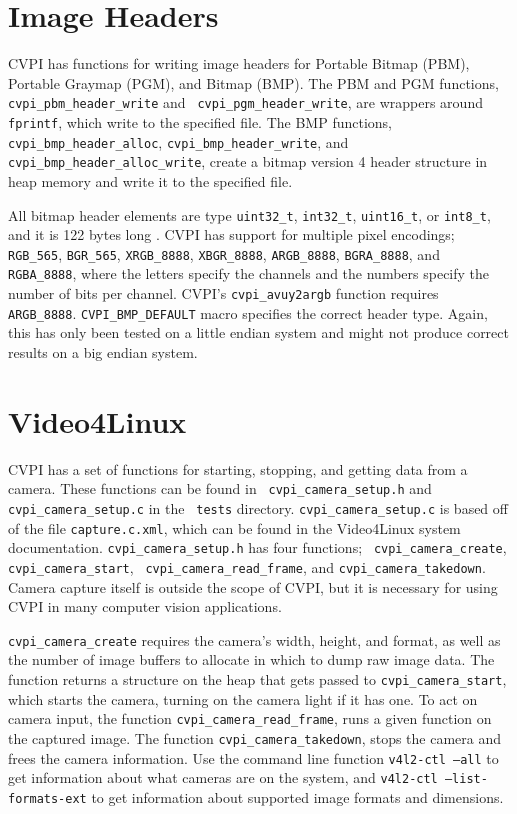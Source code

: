 \documentclass[12pt]{report}
\begin{document}
\chapter{Image Headers}
\label{sec-7}
CVPI has functions for writing image headers for Portable Bitmap
(PBM), Portable Graymap (PGM), and Bitmap (BMP). The PBM and PGM
functions, {\tt cvpi\_pbm\_header\_write} and {\tt
  cvpi\_pgm\_header\_write}, are wrappers around {\tt fprintf}, which
write to the specified file. The BMP functions, {\tt
  cvpi\_bmp\_header\_alloc}, {\tt cvpi\_bmp\_header\_write}, and {\tt
  cvpi\_bmp\_header\_alloc\_write}, create a bitmap version 4 header structure
in heap memory and write it to the specified file.

All bitmap header elements are type {\tt uint32\_t}, {\tt int32\_t},
{\tt uint16\_t}, or {\tt int8\_t}, and it is 122 bytes long
\cite{BITMAPV4HEADER}. CVPI has support for multiple pixel encodings;
{\tt RGB\_565}, {\tt BGR\_565}, {\tt XRGB\_8888}, {\tt XBGR\_8888},
{\tt ARGB\_8888}, {\tt BGRA\_8888}, and {\tt RGBA\_8888}, where the
letters specify the channels and the numbers specify the number of
bits per channel. CVPI's {\tt cvpi\_avuy2argb} function requires {\tt
  ARGB\_8888}. {\tt CVPI\_BMP\_DEFAULT} macro specifies the correct
header type. Again, this has only been tested on a little endian
system and might not produce correct results on a big endian system.

\chapter{Video4Linux}
\label{sec-4} 
CVPI has a set of functions for starting, stopping, and getting data
from a camera. These functions can be found in {\tt
  cvpi\_camera\_setup.h} and {\tt cvpi\_camera\_setup.c} in the {\tt
  tests} directory. {\tt cvpi\_camera\_setup.c} is based off of the
file {\tt capture.c.xml}, which can be found in the Video4Linux system
documentation. {\tt cvpi\_camera\_setup.h} has four functions; {\tt
  cvpi\_camera\_create}, {\tt cvpi\_camera\_start}, {\tt
  cvpi\_camera\_read\_frame}, and {\tt cvpi\_camera\_takedown}.
Camera capture itself is outside the scope of CVPI, but it is necessary
for using CVPI in many computer vision applications.

{\tt cvpi\_camera\_create} requires the camera's width, height, and
format, as well as the number of image buffers to allocate in which to
dump raw image data. The function returns a structure on the heap that
gets passed to {\tt cvpi\_camera\_start}, which starts the camera,
turning on the camera light if it has one. To act on camera input, the
function {\tt cvpi\_camera\_read\_frame}, runs a given function on the
captured image. The function {\tt cvpi\_camera\_takedown}, stops the
camera and frees the camera information. Use the command line function
{\tt v4l2-ctl --all} to get information about what cameras are on the
system, and {\tt v4l2-ctl --list-formats-ext} to get information about
supported image formats and dimensions.
\end{document}
